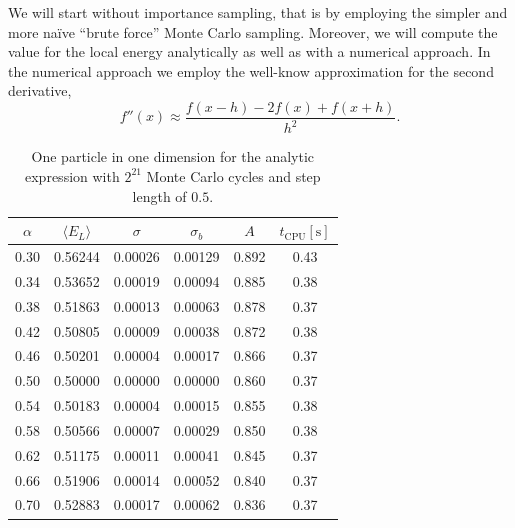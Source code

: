 \documentclass[
    a4paper, aps, twocolumn, floatfix, superscriptaddress,
    nofootinbib]{revtex4-1}
\newcommand{\1}{\mathds{1}}
\begin{document}
        We will start without importance sampling, that is by employing the
        simpler and more naïve ``brute force'' Monte Carlo sampling. Moreover, we
        will compute the value for the local energy analytically as well as with
        a numerical approach.  In the numerical approach we employ the well-know
        approximation for the second derivative,
        \begin{equation}
                f''(x) \approx \frac{f(x-h) - 2f(x) + f(x+h)}{h^2}.
        \end{equation}

        \begin{table}
            \centering
            \caption{One particle in one dimension for the analytic expression
            with $2^{21}$ Monte Carlo cycles and step length of $0.5$.}
            \begin{ruledtabular}
                \begin{tabular}{cccccc}
                    $\alpha$ & $\langle  E_L\rangle$ & $\sigma$ & $\sigma_b$
                    & $A$ & $t_{\text{CPU}} [\si{\second}]$ \\
                    \hline
                    0.30&0.56244&0.00026&0.00129&0.892&0.43\\
                    0.34&0.53652&0.00019&0.00094&0.885&0.38\\
                    0.38&0.51863&0.00013&0.00063&0.878&0.37\\
                    0.42&0.50805&0.00009&0.00038&0.872&0.38\\
                    0.46&0.50201&0.00004&0.00017&0.866&0.37\\
                    0.50&0.50000&0.00000&0.00000&0.860&0.37\\
                    0.54&0.50183&0.00004&0.00015&0.855&0.38\\
                    0.58&0.50566&0.00007&0.00029&0.850&0.38\\
                    0.62&0.51175&0.00011&0.00041&0.845&0.37\\
                    0.66&0.51906&0.00014&0.00052&0.840&0.37\\
                    0.70&0.52883&0.00017&0.00062&0.836&0.37\\
                \end{tabular}
            \end{ruledtabular}
            \label{tab:1D1N_analytic}
        \end{table}
\end{document}
